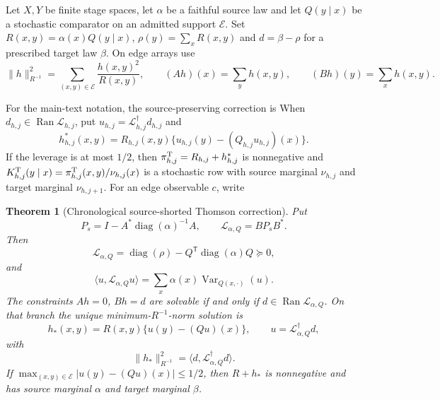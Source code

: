 \documentclass[11pt]{article}
\newtheorem{theorem}{Theorem}[section]
\numberwithin{equation}{section}
\theoremstyle{definition}
\theoremstyle{remark}
\newcommand{\Ran}{\operatorname{Ran}}
\newcommand{\diag}{\operatorname{diag}}
\begin{document}
Let $X,Y$ be finite stage spaces, let $\alpha$ be a faithful source law and
let $Q(y\mid x)$ be a stochastic comparator on an admitted support
$\mathcal E$.  Set
$R(x,y)=\alpha(x)Q(y\mid x)$,
$\rho(y)=\sum_xR(x,y)$ and $d=\beta-\rho$ for a prescribed target law
$\beta$.  On edge arrays use
\begin{equation}
 \|h\|_{R^{-1}}^2=\sum_{(x,y)\in\mathcal E}\frac{h(x,y)^2}{R(x,y)},
 \qquad
 (Ah)(x)=\sum_yh(x,y),\qquad(Bh)(y)=\sum_xh(x,y).
 \label{eq:supp-same-cylinder-edge-geometry}
\end{equation}

For the main-text notation, the source-preserving correction is
When $d_{h,j}\in\Ran\mathcal L_{h,j}$, put
$u_{h,j}=\mathcal L_{h,j}^{\dagger}d_{h,j}$ and
\begin{equation}
 h_{h,j}^*(x,y)=R_{h,j}(x,y)
 \{u_{h,j}(y)-(Q_{h,j}u_{h,j})(x)\}.
 \label{eq:main-thomson-correction}
\end{equation}
If the leverage is at most $1/2$, then
$\pi_{h,j}^{\rm T}=R_{h,j}+h_{h,j}^*$ is nonnegative and
$K_{h,j}^{\rm T}(y\mid x)=\pi_{h,j}^{\rm T}(x,y)/\nu_{h,j}(x)$ is a
stochastic row with source marginal $\nu_{h,j}$ and target marginal
$\nu_{h,j+1}$.  For an edge observable $c$, write
\begin{theorem}[Chronological source-shorted Thomson correction]
\label{thm:supp-chronological-thomson}
Put
\begin{equation}
 P_s=I-A^*\diag(\alpha)^{-1}A,
 \qquad
 \mathcal L_{\alpha,Q}=BP_sB^*.
 \label{eq:supp-thomson-Ps}
\end{equation}
Then
\begin{equation}
 \mathcal L_{\alpha,Q}
 =\diag(\rho)-Q^{\mathsf T}\diag(\alpha)Q\succeq0,
 \label{eq:supp-thomson-L}
\end{equation}
and
\begin{equation}
 \langle u,\mathcal L_{\alpha,Q}u\rangle
 =\sum_x\alpha(x)\operatorname{Var}_{Q(x,\cdot)}(u).
 \label{eq:supp-thomson-variance}
\end{equation}
The constraints $Ah=0$, $Bh=d$ are solvable if and only if
$d\in\Ran\mathcal L_{\alpha,Q}$.  On that branch the unique
minimum-$R^{-1}$-norm solution is
\begin{equation}
 h_*(x,y)=R(x,y)\{u(y)-(Qu)(x)\},
 \qquad u=\mathcal L_{\alpha,Q}^{\dagger}d,
 \label{eq:supp-thomson-hstar}
\end{equation}
with
\begin{equation}
 \|h_*\|_{R^{-1}}^2
 =\langle d,\mathcal L_{\alpha,Q}^{\dagger}d\rangle.
 \label{eq:supp-thomson-energy}
\end{equation}
If $\max_{(x,y)\in\mathcal E}|u(y)-(Qu)(x)|\le1/2$, then
$R+h_*$ is nonnegative and has source marginal $\alpha$ and target marginal
$\beta$.
\end{theorem}
\end{document}
